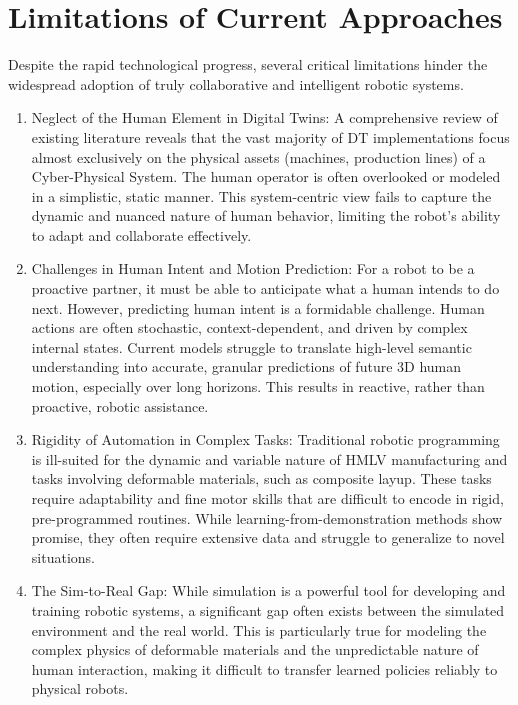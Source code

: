 \section{Limitations of Current Approaches}
\label{sec:limitations}

Despite the rapid technological progress, several critical limitations hinder the widespread adoption of truly collaborative and intelligent robotic systems.

\begin{enumerate}
    \item Neglect of the Human Element in Digital Twins: A comprehensive review of existing literature reveals that the vast majority of DT implementations focus almost exclusively on the physical assets (machines, production lines) of a Cyber-Physical System. The human operator is often overlooked or modeled in a simplistic, static manner. This system-centric view fails to capture the dynamic and nuanced nature of human behavior, limiting the robot's ability to adapt and collaborate effectively.

    \item Challenges in Human Intent and Motion Prediction: For a robot to be a proactive partner, it must be able to anticipate what a human intends to do next. However, predicting human intent is a formidable challenge. Human actions are often stochastic, context-dependent, and driven by complex internal states. Current models struggle to translate high-level semantic understanding into accurate, granular predictions of future 3D human motion, especially over long horizons. This results in reactive, rather than proactive, robotic assistance.

    \item Rigidity of Automation in Complex Tasks: Traditional robotic programming is ill-suited for the dynamic and variable nature of HMLV manufacturing and tasks involving deformable materials, such as composite layup. These tasks require adaptability and fine motor skills that are difficult to encode in rigid, pre-programmed routines. While learning-from-demonstration methods show promise, they often require extensive data and struggle to generalize to novel situations.

    \item The Sim-to-Real Gap: While simulation is a powerful tool for developing and training robotic systems, a significant gap often exists between the simulated environment and the real world. This is particularly true for modeling the complex physics of deformable materials and the unpredictable nature of human interaction, making it difficult to transfer learned policies reliably to physical robots.
\end{enumerate}

